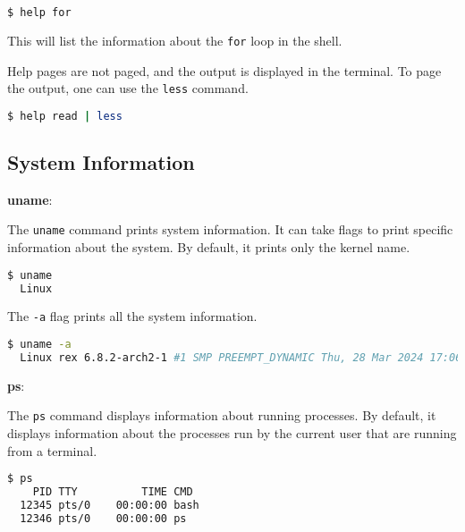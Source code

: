 \begin{lstlisting}[language=bash]
$ help for
\end{lstlisting}

This will list the information about the \texttt{for} loop in the shell.

Help pages are not paged, and the output is displayed in the terminal.
To page the output, one can use the \texttt{less} command.

\begin{lstlisting}[language=bash]
$ help read | less
\end{lstlisting}


\subsection{System Information}

\textbf{uname}:

The \texttt{uname} command prints system information.
It can take flags to print specific information about the system.
By default, it prints only the kernel name.

\begin{lstlisting}[language=bash]
  $ uname
  Linux
\end{lstlisting}

The \texttt{-a} flag prints all the system information.

\begin{lstlisting}[language=bash]
  $ uname -a
  Linux rex 6.8.2-arch2-1 #1 SMP PREEMPT_DYNAMIC Thu, 28 Mar 2024 17:06:35 +0000 x86_64 GNU/Linux
\end{lstlisting}

\textbf{ps}:

The \texttt{ps} command displays information about running processes.
By default, it displays information about the processes run by the current user that are running from a terminal.

\begin{lstlisting}[language=bash]
  $ ps
    PID TTY          TIME CMD
  12345 pts/0    00:00:00 bash
  12346 pts/0    00:00:00 ps
\end{lstlisting}

